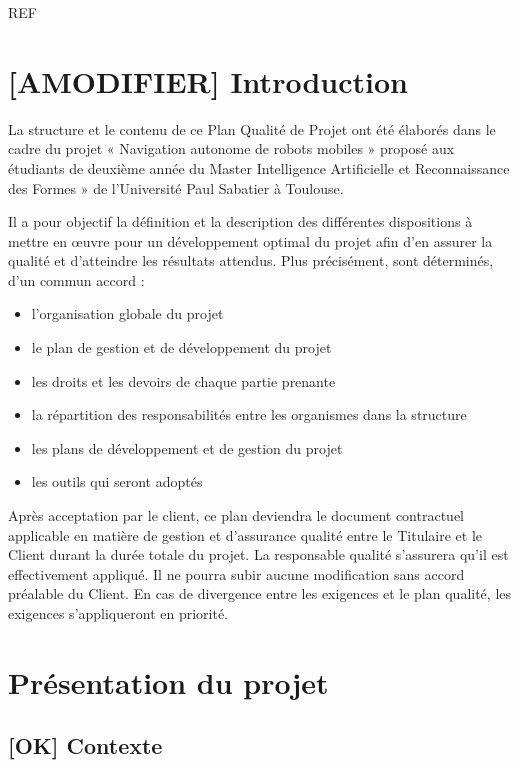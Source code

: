 \documentclass[10pt,a4paper]{article}
\begin{document}
\newpage

REF

\newpage
\tableofcontents
\newpage
	

\section{[AMODIFIER] Introduction}
\label{sec:introduction}

La structure et le contenu de ce Plan Qualité de Projet ont été élaborés dans le cadre du projet « Navigation autonome de robots mobiles » proposé aux étudiants de deuxième année du Master  Intelligence Artificielle et Reconnaissance des Formes » de l'Université Paul Sabatier à Toulouse.

Il a pour objectif la définition et la description des différentes dispositions à mettre en œuvre pour un développement optimal du projet afin d’en assurer la qualité et d’atteindre les résultats attendus. Plus précisément, sont déterminés, d’un commun accord :
\begin{itemize}
\item l’organisation globale du projet 
\item le plan de gestion et de développement du projet
\item les droits et les devoirs de chaque partie prenante
\item la répartition des responsabilités entre les organismes dans la structure
\item les plans de développement et de gestion du projet
\item les outils qui seront adoptés 
\end{itemize}

Après acceptation par le client, ce plan deviendra le document contractuel applicable en matière de gestion et d’assurance qualité entre le Titulaire et le Client durant la durée totale du projet. La responsable qualité s’assurera qu’il est effectivement appliqué. Il ne pourra subir aucune modification sans accord préalable du Client. En cas de divergence entre les exigences et le plan qualité, les exigences s’appliqueront en priorité.


\section{Présentation du projet}
\label{sec:presentation}

\subsection{[OK] Contexte}
\end{document}
